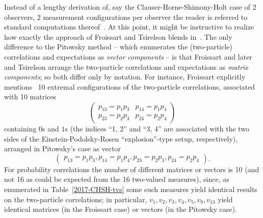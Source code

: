 Instead of a lengthy derivation of, say the Clauser-Horne-Shimony-Holt case of 2 observers, 2 measurement configurations per observer
the reader is referred to standard computations thereof~\cite{pitowsky-89a,Pit-94,pitowsky,svozil-2016-s,svozil-2016-pu-book}.
At this point, it might be instructive to realize how exactly the approach of  Froissart and Tsirelson blends in~\cite{froissart-81,cirelson}.
The only difference to the Pitowsky method -- which enumerates the (two-particle) correlations and expectations as {\em vector components} --
is that
Froissart and later  and Tsirelson arrange the two-particle correlations and expectations as {\em matrix components};
so both differ only by notation.
For instance, Froissart explicitly mentions~\cite[pp.~242,243]{froissart-81} 10 extremal configurations of the two-particle correlations,
associated with 10 matrices
\begin{equation}
\begin{pmatrix}p_{13}=p_1p_3 &p_{14}=p_1p_4 \\p_{23}=p_2p_3 &p_{24}=p_2p_4 \end{pmatrix}
\end{equation}
containing $0$s and $1$s
(the indices ``1, 2'' and ``3, 4'' are associated with the two sides of the Einstein-Podolsky-Rosen ``explosion''-type setup, respectively),
arranged in Pitowsky's case as vector
\begin{equation}
\begin{pmatrix}p_{13}=p_1p_3, p_{14}=p_1p_4, p_{23}=p_2p_3, p_{24}=p_2p_4 \end{pmatrix}.
\end{equation}
For probability correlations the number of different matrices or vectors is 10 (and not 16 as could be expected from the 16 two-valued measures),
since, as enumerated in Table~\ref{2017-CHSH-tvs} some such measures yield identical results on the two-particle correlations; in particular,
$v_1, v_2, v_3, v_4, v_5, v_9, v_{13}$  yield identical matrices (in the Froissart case) or vectors (in the Pitowsky case).

